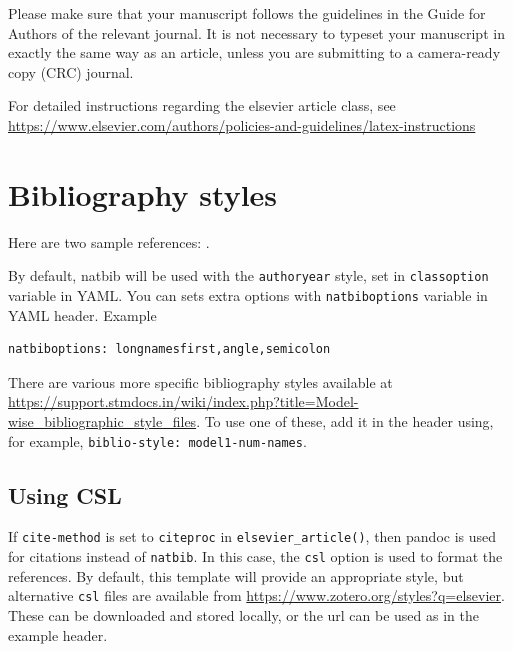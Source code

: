 \documentclass[
  authoryear,
  preprint,
  3p]{elsarticle}
\begin{document}
    \ifdefined\Shaded\renewenvironment{Shaded}{\begin{tcolorbox}[boxrule=0pt, interior hidden, sharp corners, breakable, enhanced, borderline west={3pt}{0pt}{shadecolor}, frame hidden]}{\end{tcolorbox}}\fi

Please make sure that your manuscript follows the guidelines in the
Guide for Authors of the relevant journal. It is not necessary to
typeset your manuscript in exactly the same way as an article, unless
you are submitting to a camera-ready copy (CRC) journal.

For detailed instructions regarding the elsevier article class, see
\url{https://www.elsevier.com/authors/policies-and-guidelines/latex-instructions}

\hypertarget{bibliography-styles}{%
\section{Bibliography styles}\label{bibliography-styles}}

Here are two sample references: \citet{Feynman1963118}
\citet{Dirac1953888}.

By default, natbib will be used with the \texttt{authoryear} style, set
in \texttt{classoption} variable in YAML. You can sets extra options
with \texttt{natbiboptions} variable in YAML header. Example

\begin{verbatim}
natbiboptions: longnamesfirst,angle,semicolon
\end{verbatim}

There are various more specific bibliography styles available at
\url{https://support.stmdocs.in/wiki/index.php?title=Model-wise_bibliographic_style_files}.
To use one of these, add it in the header using, for example,
\texttt{biblio-style:\ model1-num-names}.

\hypertarget{using-csl}{%
\subsection{Using CSL}\label{using-csl}}

If \texttt{cite-method} is set to \texttt{citeproc} in
\texttt{elsevier\_article()}, then pandoc is used for citations instead
of \texttt{natbib}. In this case, the \texttt{csl} option is used to
format the references. By default, this template will provide an
appropriate style, but alternative \texttt{csl} files are available from
\url{https://www.zotero.org/styles?q=elsevier}. These can be downloaded
and stored locally, or the url can be used as in the example header.
\end{document}
